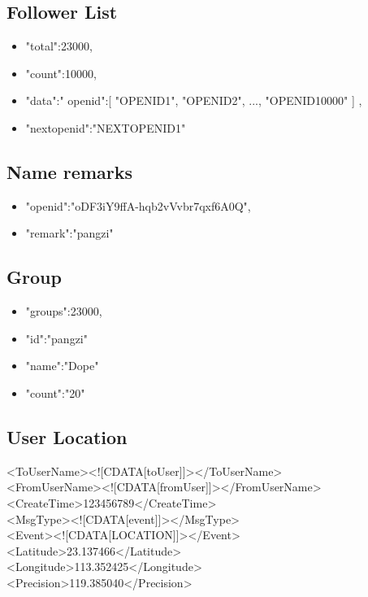 \documentclass{article}
\begin{document}
\subsection{Follower List}
\begin{itemize}
	\item "total":23000,
	\item "count":10000,
	\item "data":{"
     openid":[
        "OPENID1",
        "OPENID2",
        ...,
        "OPENID10000"
     ]
   },
	\item  "nextopenid":"NEXTOPENID1"
\end{itemize}


\subsection{Name remarks}
\begin{itemize}
	\item "openid":"oDF3iY9ffA-hqb2vVvbr7qxf6A0Q",
	\item "remark":"pangzi"
\end{itemize}

\subsection{Group}
\begin{itemize}
	\item "groups":23000,
	\item "id":"pangzi"
	\item "name":"Dope"
	\item "count":"20"
\end{itemize}

\subsection{User Location}

<ToUserName><![CDATA[toUser]]></ToUserName>\\
<FromUserName><![CDATA[fromUser]]></FromUserName>\\
<CreateTime>123456789</CreateTime>\\
<MsgType><![CDATA[event]]></MsgType>\\
<Event><![CDATA[LOCATION]]></Event>\\
<Latitude>23.137466</Latitude>\\
<Longitude>113.352425</Longitude>\\
<Precision>119.385040</Precision>\\

	
\end{document}
